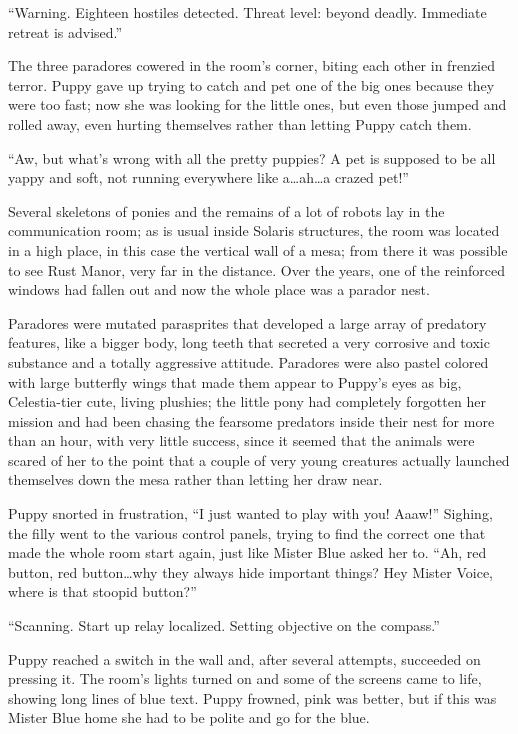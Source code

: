 \horizonline


``{\mt Warning. Eighteen hostiles detected. Threat level: beyond deadly. Immediate retreat is advised.}''

The three paradores cowered in the room's corner, biting each other in frenzied terror. Puppy gave up trying to catch and pet one of the big ones because they were too fast; now she was looking for the little ones, but even those jumped and rolled away, even hurting themselves rather than letting Puppy catch them.

``Aw, but what's wrong with all the pretty puppies? A pet is supposed to be all yappy and soft, not running everywhere like a\dots ah\dots a crazed pet!''

Several skeletons of ponies and the remains of a lot of robots lay in the communication room; as is usual inside Solaris structures, the room was located in a high place, in this case the vertical wall of a mesa; from there it was possible to see Rust Manor, very far in the distance. Over the years, one of the reinforced windows had fallen out and now the whole place was a parador nest.

Paradores were mutated parasprites that developed a large array of predatory features, like a bigger body, long teeth that secreted a very corrosive and toxic substance and a totally aggressive attitude. Paradores were also pastel colored with large butterfly wings that made them appear to Puppy's eyes as big, Celestia-tier cute, living plushies; the little pony had completely forgotten her mission and had been chasing the fearsome predators inside their nest for more than an hour, with very little success, since it seemed that the animals were scared of her to the point that a couple of very young creatures actually launched themselves down the mesa rather than letting her draw near.

Puppy snorted in frustration, ``I just wanted to play with you! Aaaw!'' Sighing, the filly went to the various control panels, trying to find the correct one that made the whole room start again, just like Mister Blue asked her to. ``Ah, red button, red button\dots why they always hide important things? Hey Mister Voice, where is that stoopid button?''

``{\mt Scanning. Start up relay localized. Setting objective on the compass.}''

Puppy reached a switch in the wall and, after several attempts, succeeded on pressing it. The room's lights turned on and some of the screens came to life, showing long lines of blue text. Puppy frowned, pink was better, but if this was Mister Blue home she had to be polite and go for the blue.

